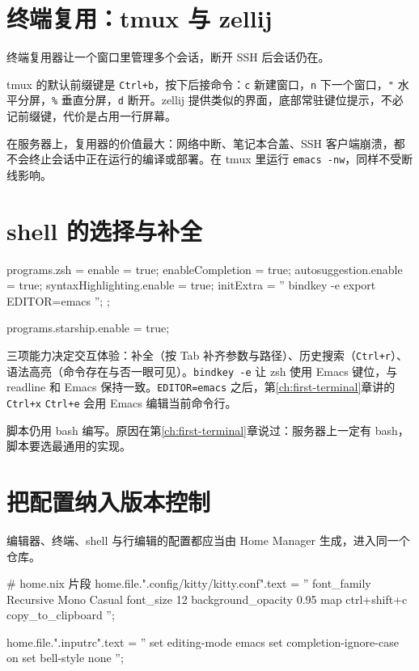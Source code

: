 \section{终端复用：tmux 与 zellij}

终端复用器让一个窗口里管理多个会话，断开 SSH 后会话仍在。


tmux 的默认前缀键是 \texttt{Ctrl+b}，按下后接命令：\texttt{c} 新建窗口，\texttt{n} 下一个窗口，\texttt{"} 水平分屏，\texttt{\%} 垂直分屏，\texttt{d} 断开。zellij 提供类似的界面，底部常驻键位提示，不必记前缀键，代价是占用一行屏幕。

在服务器上，复用器的价值最大：网络中断、笔记本合盖、SSH 客户端崩溃，都不会终止会话中正在运行的编译或部署。在 tmux 里运行 \texttt{emacs -nw}，同样不受断线影响。

\section{shell 的选择与补全}

\begin{nixcode}
programs.zsh = {
  enable = true;
  enableCompletion = true;
  autosuggestion.enable = true;
  syntaxHighlighting.enable = true;
  initExtra = ''
    bindkey -e
    export EDITOR=emacs
  '';
};

programs.starship.enable = true;
\end{nixcode}

三项能力决定交互体验：补全（按 Tab 补齐参数与路径）、历史搜索（\texttt{Ctrl+r}）、语法高亮（命令存在与否一眼可见）。\texttt{bindkey -e} 让 zsh 使用 Emacs 键位，与 readline 和 Emacs 保持一致。\texttt{EDITOR=emacs} 之后，第\ref{ch:first-terminal}章讲的 \texttt{Ctrl+x} \texttt{Ctrl+e} 会用 Emacs 编辑当前命令行。

脚本仍用 bash 编写。原因在第\ref{ch:first-terminal}章说过：服务器上一定有 bash，脚本要选最通用的实现。

\section{把配置纳入版本控制}

编辑器、终端、shell 与行编辑的配置都应当由 Home Manager 生成，进入同一个仓库。

\begin{nixcode}
# home.nix 片段
home.file.".config/kitty/kitty.conf".text = ''
  font_family      Recursive Mono Casual
  font_size        12
  background_opacity 0.95
  map ctrl+shift+c copy_to_clipboard
'';

home.file.".inputrc".text = ''
  set editing-mode emacs
  set completion-ignore-case on
  set bell-style none
'';
\end{nixcode}

